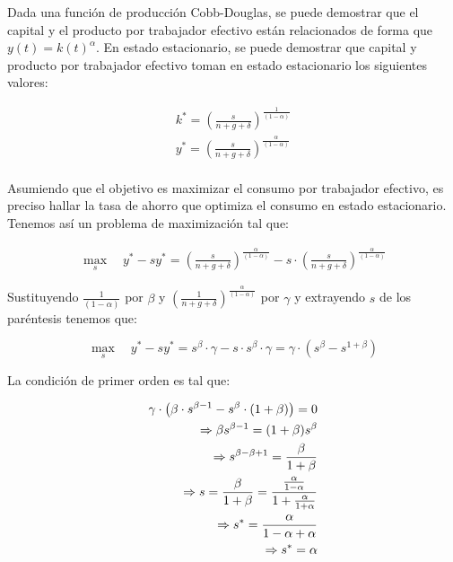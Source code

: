 \documentclass{nuevotema}
\begin{document}
Dada una función de producción Cobb-Douglas, se puede demostrar que el capital y el producto por trabajador efectivo están relacionados de forma que $y(t) = k(t)^\alpha$. En estado estacionario, se puede demostrar que capital y producto por trabajador efectivo toman en estado estacionario los siguientes valores:

\begin{align*}
k^* = \left( \frac{s}{n+g+\delta} \right)^{\frac{1}{(1-\alpha)}} \\
y^* = \left( \frac{s}{n+g+\delta} \right)^{\frac{\alpha}{(1-\alpha)}} \\
\end{align*}

Asumiendo que el objetivo es maximizar el consumo por trabajador efectivo, es preciso hallar la tasa de ahorro que optimiza el consumo en estado estacionario. Tenemos así un problema de maximización tal que:

\begin{align*}
\underset{s}{\max} \quad y^* - sy^* = \left( \frac{s}{n+g+\delta} \right)^{\frac{\alpha}{(1-\alpha)}} - s \cdot \left( \frac{s}{n+g+\delta} \right)^{\frac{\alpha}{(1-\alpha)}}
\end{align*}

Sustituyendo $\frac{1}{(1-\alpha)}$ por $\beta$ y $\left( \frac{1}{n+g+\delta} \right)^{\frac{\alpha}{(1-\alpha)}}$ por $\gamma$ y extrayendo $s$ de los paréntesis tenemos que:

\begin{equation*}
\underset{s}{\max} \quad y^* - sy^* = s^\beta \cdot \gamma - s \cdot s^\beta \cdot \gamma = \gamma \cdot \left( s^\beta - s^{1+\beta} \right)
\end{equation*}

La condición de primer orden es tal que:

\begin{align*}
\gamma \cdot \left( \beta \cdot s^{\beta-1} - s^\beta \cdot \left( 1+\beta \right) \right) = 0 \\
\Rightarrow \beta s^{\beta-1} = (1+\beta) s^\beta \\
\Rightarrow s^{\beta - \beta + 1} = \frac{\beta}{1+\beta} \\
\Rightarrow s = \frac{\beta}{1+\beta} = \frac{\frac{\alpha}{1-\alpha}}{1+\frac{\alpha}{1+\alpha}} \\
\Rightarrow s^* = \frac{\alpha}{1-\alpha + \alpha} \\
\Rightarrow s^* = \alpha
\end{align*}
\end{document}
